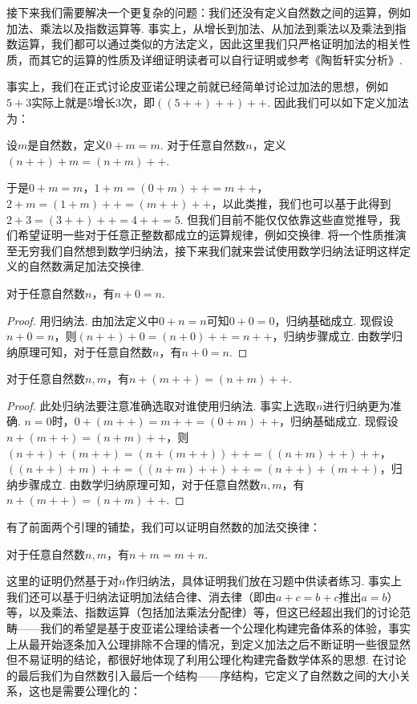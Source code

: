 接下来我们需要解决一个更复杂的问题：我们还没有定义自然数之间的运算，例如加法、乘法以及指数运算等. 事实上，从增长到加法、从加法到乘法以及乘法到指数运算，我们都可以通过类似的方法定义，因此这里我们只严格证明加法的相关性质，而其它的运算的性质及详细证明读者可以自行证明或参考《陶哲轩实分析》.

事实上，我们在正式讨论皮亚诺公理之前就已经简单讨论过加法的思想，例如$5+3$实际上就是5增长3次，即$((5++)++)++$. 因此我们可以如下定义加法为：

\begin{definition}
    设$m$是自然数，定义$0+m=m$. 对于任意自然数$n$，定义$(n++)+m=(n+m)++$.
\end{definition}

于是$0+m=m$，$1+m=(0+m)++=m++$，$2+m=(1+m)++=(m++)++$，以此类推，我们也可以基于此得到$2+3=(3++)++=4++=5$. 但我们目前不能仅仅依靠这些直觉推导，我们希望证明一些对于任意正整数都成立的运算规律，例如交换律. 将一个性质推演至无穷我们自然想到数学归纳法，接下来我们就来尝试使用数学归纳法证明这样定义的自然数满足加法交换律.

\begin{lemma}
    对于任意自然数$n$，有$n+0=n$.
\end{lemma}
\begin{proof}
    用归纳法. 由加法定义中$0+n=n$可知$0+0=0$，归纳基础成立. 现假设$n+0=n$，则$(n++)+0=(n+0)++=n++$，归纳步骤成立. 由数学归纳原理可知，对于任意自然数$n$，有$n+0=n$.
\end{proof}

\begin{lemma}
    对于任意自然数$n,m$，有$n+(m++)=(n+m)++$.
\end{lemma}
\begin{proof}
    此处归纳法要注意准确选取对谁使用归纳法. 事实上选取$n$进行归纳更为准确. $n=0$时，$0+(m++)=m++=(0+m)++$，归纳基础成立. 现假设$n+(m++)=(n+m)++$，则$(n++)+(m++)=(n+(m++))++=((n+m)++)++$，$((n++)+m)++=((n+m)++)++=(n++)+(m++)$，归纳步骤成立. 由数学归纳原理可知，对于任意自然数$n,m$，有$n+(m++)=(n+m)++$.
\end{proof}

有了前面两个引理的铺垫，我们可以证明自然数的加法交换律：

\begin{theorem}%
    对于任意自然数$n,m$，有$n+m=m+n$.
\end{theorem}
这里的证明仍然基于对$n$作归纳法，具体证明我们放在习题中供读者练习. 事实上我们还可以基于归纳法证明加法结合律、消去律（即由$a+c=b+c$推出$a=b$）等，以及乘法、指数运算（包括加法乘法分配律）等，但这已经超出我们的讨论范畴——我们的希望是基于皮亚诺公理给读者一个公理化构建完备体系的体验，事实上从最开始逐条加入公理排除不合理的情况，到定义加法之后不断证明一些很显然但不易证明的结论，都很好地体现了利用公理化构建完备数学体系的思想. 在讨论的最后我们为自然数引入最后一个结构——序结构，它定义了自然数之间的大小关系，这也是需要公理化的：

